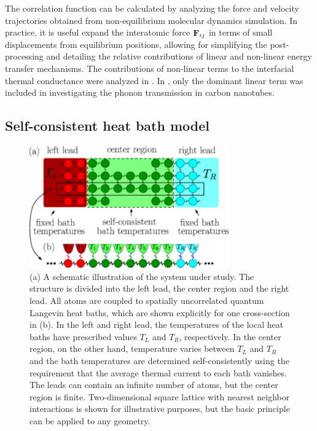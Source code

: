 The correlation function can be calculated by analyzing the force and velocity trajectories obtained from non-equilibrium molecular dynamics simulation. In practice, it is useful expand the interatomic force $\mathbf{F}_{ij}$ in terms of small displacements from equilibrium positions, allowing for simplifying the post-processing and detailing the relative contributions of linear and non-linear energy transfer mechanisms. The contributions of non-linear terms to the interfacial thermal conductance were analyzed in . In , only the dominant linear term was included in investigating the phonon transmission in carbon nanotubes.


\subsection{Self-consistent heat bath model}




\begin{figure}
\begin{center}
 \includegraphics[width=8.6cm]{pics/pic_scbaths.pdf}
 \caption{(a) A schematic illustration of the system under study. The structure is divided into the left lead, the center region and the right lead. All atoms are coupled to spatially uncorrelated quantum Langevin heat baths, which are shown explicitly for one cross-section in (b). In the left and right lead, the temperatures of the local heat baths have prescribed values $T_L$ and $T_R$, respectively. In the center region, on the other hand, temperature varies between $T_L$ and $T_R$ and the bath temperatures are determined self-consistently using the requirement that the average thermal current to each bath vanishes. The leads can contain an infinite number of atoms, but the center region is finite. Two-dimensional square lattice with nearest neighbor interactions is shown for illustrative purposes, but the basic principle can be applied to any geometry.}
\label{fig:sud1}
\end{center}
\end{figure}


